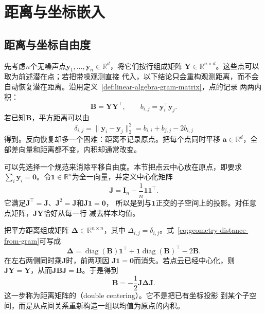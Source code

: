 \section{距离与坐标嵌入}
\label{sec:geometry-distance-coordinate-embedding}

\subsection{距离与坐标自由度}

先考虑$n$个无噪声点$\bm{y}_1,\ldots,\bm{y}_n\in\mathbb{R}^d$，将它们按行组成矩阵
$\bm{Y}\in\mathbb{R}^{n\times d}$。这些点可以取为前述潜在点；若把带噪观测直接
代入，以下结论只会重构观测距离，而不会自动恢复潜在距离。沿用定义~\ref{def:linear-algebra-gram-matrix}，点的记录
两两内积：
\[
  \bm{B}=\bm{Y}\bm{Y}^{\top},
  \qquad
  b_{i,j}=\bm{y}_i^{\top}\bm{y}_j.
\]
若已知$\bm{B}$，平方距离可以由
\begin{equation}
  \delta_{i,j}
  =
  \lVert\bm{y}_i-\bm{y}_j\rVert_2^2
  =
  b_{i,i}+b_{j,j}-2b_{i,j}
  \label{eq:geometry-distance-from-gram}
\end{equation}
得到。反向恢复却多一个困难：距离不记录原点。把每个点同时平移
$\bm{a}\in\mathbb{R}^d$，全部差向量和距离都不变，内积却通常改变。

可以先选择一个规范来消除平移自由度。本节把点云中心放在原点，即要求
$\sum_i\bm{y}_i=\bm{0}$。令$\bm{1}\in\mathbb{R}^n$为全一向量，并定义中心化矩阵
\begin{equation}
  \bm{J}
  =
  \bm{I}_n-\frac{1}{n}\bm{1}\bm{1}^{\top}.
  \label{eq:geometry-centering-matrix}
\end{equation}
它满足$\bm{J}^{\top}=\bm{J}$、$\bm{J}^2=\bm{J}$和$\bm{J}\bm{1}=\bm{0}$，
所以是到与$\bm{1}$正交的子空间上的投影。对任意点矩阵，$\bm{J}\bm{Y}$恰好从每一行
减去样本均值。

把平方距离组成矩阵
$\bm{\Delta}\in\mathbb{R}^{n\times n}$，其中
$\Delta_{i,j}=\delta_{i,j}$。式~\eqref{eq:geometry-distance-from-gram}可写成
\[
  \bm{\Delta}
  =
  \operatorname{diag}(\bm{B})\bm{1}^{\top}
  +
  \bm{1}\operatorname{diag}(\bm{B})^{\top}
  -
  2\bm{B}.
\]
在左右两侧同时乘$\bm{J}$时，前两项因
$\bm{J}\bm{1}=\bm{0}$而消失。若点云已经中心化，则
$\bm{J}\bm{Y}=\bm{Y}$，从而$\bm{J}\bm{B}\bm{J}=\bm{B}$。于是得到
\begin{equation}
  \bm{B}
  =
  -\frac{1}{2}\bm{J}\bm{\Delta}\bm{J}.
  \label{eq:geometry-double-centering}
\end{equation}
这一步称为距离矩阵的（double centering）。它不是把已有坐标投影
到某个子空间，而是从点间关系重新构造一组以均值为原点的内积。

